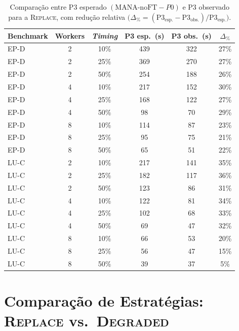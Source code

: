 \begin{table}[htb]
  \caption{Comparação entre P3 esperado $(\text{MANA-noFT} - P0)$ e P3 observado
           para a \textsc{Replace}, com redução relativa
           $\bigl(\Delta_{\%} = (\text{P3}_\text{esp.} - \text{P3}_\text{obs.}) /
           \text{P3}_\text{esp.}\bigr)$.}
  \label{tab:warm-restart-gap}
  \centering
  \small
  \begin{tabular}{l c c c c c}
    \toprule
    Benchmark & Workers & \textit{Timing} & P3 esp.\ (s) & P3 obs.\ (s) & $\Delta_{\%}$ \\
    \midrule
    EP-D & 2 & 10\% & 439 & 322 & 27\% \\
    EP-D & 2 & 25\% & 369 & 270 & 27\% \\
    EP-D & 2 & 50\% & 254 & 188 & 26\% \\
    \addlinespace
    EP-D & 4 & 10\% & 217 & 152 & 30\% \\
    EP-D & 4 & 25\% & 168 & 122 & 27\% \\
    EP-D & 4 & 50\% &  98 &  70 & 29\% \\
    \addlinespace
    EP-D & 8 & 10\% & 114 &  87 & 23\% \\
    EP-D & 8 & 25\% &  95 &  75 & 21\% \\
    EP-D & 8 & 50\% &  65 &  51 & 22\% \\
    \addlinespace
    LU-C & 2 & 10\% & 217 & 141 & 35\% \\
    LU-C & 2 & 25\% & 182 & 117 & 36\% \\
    LU-C & 2 & 50\% & 123 &  86 & 31\% \\
    \addlinespace
    LU-C & 4 & 10\% & 122 &  81 & 34\% \\
    LU-C & 4 & 25\% & 102 &  68 & 33\% \\
    LU-C & 4 & 50\% &  69 &  47 & 32\% \\
    \addlinespace
    LU-C & 8 & 10\% &  66 &  53 & 20\% \\
    LU-C & 8 & 25\% &  56 &  47 & 15\% \\
    LU-C & 8 & 50\% &  39 &  37 &  5\% \\
    \bottomrule
  \end{tabular}
\end{table}


\section{Comparação de Estratégias: \textsc{Replace} vs.\ \textsc{Degraded}}
\label{sec:comparacao-estrategias}

